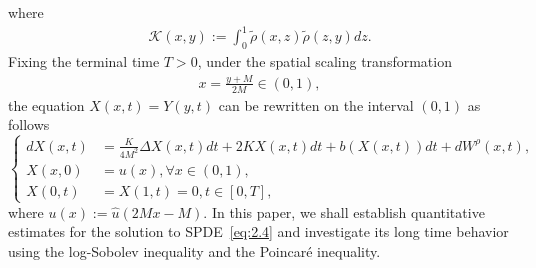 \documentclass[11pt]{article}
\numberwithin{equation}{section}%
\numberwithin{figure}{section}%
\theoremstyle{remark}
\begin{document}
	where
		\begin{align}\label{eq:noisecova}
		\mathcal{K}(x,y):=\int_{0}^{1}\tilde{\rho}(x,z)\tilde{\rho}(z,y)dz.
	\end{align}
	Fixing the terminal time $T>0$, under the spatial scaling transformation
	\begin{align*}
		x=\frac{y+M}{2M}\in(0,1),
	\end{align*}
	the equation $X(x,t)=Y(y,t)$ can be rewritten on the interval $(0,1)$ as follows
	\begin{equation}\label{eq:2.4}
		\left\{
		\begin{aligned}
			d X(x,t)&=\frac{K}{4M^{2}}\Delta X(x,t)dt+2K X(x,t)dt+b(X(x,t))dt+ dW^{\rho}(x,t),\\
			X(x,0)&=u(x),\forall{x\in (0,1)},\\
			X(0,t)&=X(1,t)=0,t\in[0,T],
		\end{aligned}
		\right.
	\end{equation}
	where $u(x):=\hat{u}(2Mx-M)$. In this paper, we shall establish quantitative estimates for the solution to SPDE~\eqref{eq:2.4} and investigate its long time behavior using the log-Sobolev inequality and the Poincar\'e inequality. 
\end{document}

